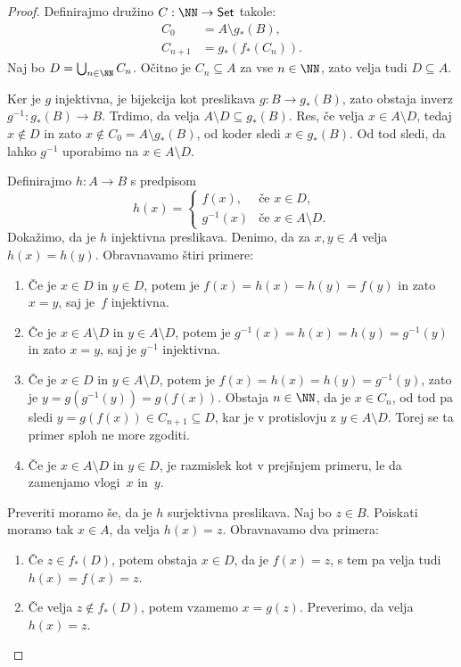 \begin{proof}
  Definirajmo družino $C : \NN \to \mathsf{Set}$ takole:
  \begin{align*}
    C_0 &= A \setminus g_{*}(B), \\
    C_{n+1} &= g_{*}(f_{*}(C_n)).
  \end{align*}
  Naj bo $D = \bigcup_{n \in \NN} C_n$. Očitno je $C_n \subseteq A$ za vse
  $n \in \NN$, zato velja tudi $D \subseteq A$.

  Ker je $g$ injektivna, je bijekcija kot preslikava $g : B \to g_{*}(B)$, zato
  obstaja inverz $g^{-1} : g_{*}(B) \to B$. Trdimo, da velja
  $A \setminus D \subseteq g_{*}(B)$. Res, če velja $x \in A \setminus D$, tedaj
  $x \not\in D$ in zato $x \not\in C_0 = A \setminus g_{*}(B)$, od koder sledi
  $x \in g_{*}(B)$. Od tod sledi, da lahko $g^{-1}$ uporabimo na
  $x \in A \setminus D$.

  Definirajmo $h : A \to B$ s predpisom
  \begin{equation*}
    h(x) =
    \begin{cases}
      f(x), & \text{če $x \in D$,} \\
      g^{-1}(x) &\text{če $x \in A \setminus D$.}
    \end{cases}
  \end{equation*}
  Dokažimo, da je $h$ injektivna preslikava.
  Denimo, da za $x, y \in A$ velja $h(x) = h(y)$. Obravnavamo štiri primere:
  \begin{enumerate}
  \item Če je $x \in D$ in $y \in D$, potem je $f(x) = h(x) = h(y) = f(y)$ in
    zato $x = y$, saj je~$f$ injektivna.
  \item Če je $x \in A \setminus D$ in $y \in A \setminus D$, potem je
    $g^{-1}(x) = h(x) = h(y) = g^{-1}(y)$ in zato $x = y$, saj je $g^{-1}$
    injektivna.
  \item Če je $x \in D$ in $y \in A \setminus D$, potem je
    $f(x) = h(x) = h(y) = g^{-1}(y)$, zato je $y = g(g^{-1}(y)) = g(f(x))$.
    Obstaja $n \in \NN$, da je $x \in C_n$, od tod pa sledi
    $y = g(f(x)) \in C_{n+1} \subseteq D$, kar je v protislovju z
    $y \in A \setminus D$. Torej se ta primer sploh ne more zgoditi.
  \item Če je $x \in A \setminus D$ in $y \in D$, je razmislek kot v prejšnjem
    primeru, le da zamenjamo vlogi~$x$ in~$y$.
  \end{enumerate}

  Preveriti moramo še, da je $h$ surjektivna preslikava. Naj bo $z \in B$.
  Poiskati moramo tak $x \in A$, da velja $h(x) = z$. Obravnavamo dva primera:
  \begin{enumerate}
  \item Če $z \in f_{*}(D)$, potem obstaja $x \in D$, da je $f(x) = z$, s tem pa
    velja tudi $h(x) = f(x) = z$.
  \item Če velja $z \not\in f_{*}(D)$, potem vzamemo $x = g(z)$. Preverimo, da
    velja $h(x) = z$.


\end{enumerate}
\end{proof}
